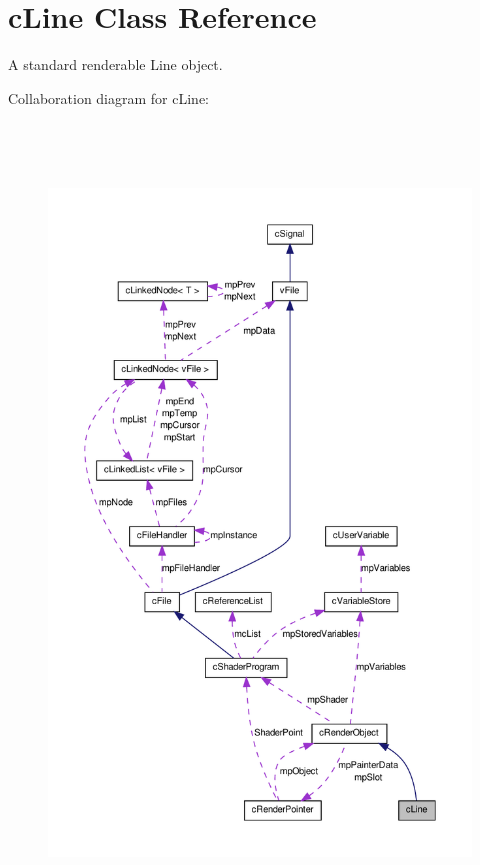 \hypertarget{classc_line}{
\section{cLine Class Reference}
\label{classc_line}
}


A standard renderable Line object.  




Collaboration diagram for cLine:\nopagebreak
\begin{figure}[H]
\begin{center}
\leavevmode
\includegraphics[height=600pt]{classc_line__coll__graph}
\end{center}
\end{figure}
